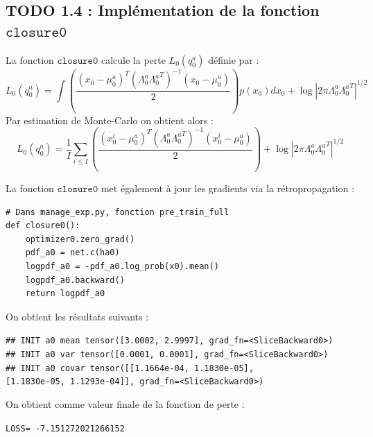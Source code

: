 \documentclass[12pt,a4paper]{article}
\begin{document}
\vspace{0.5cm}

\subsection*{TODO 1.4 : Implémentation de la fonction $\texttt{closure0}$}

La fonction $\texttt{closure0}$ calcule la perte $L_0(q_0^a)$ définie par :
\begin{equation}
    L_0(q_0^a) = \int \left( \frac{(x_0 - \mu^a_0)^T (\Lambda^a_0 {\Lambda^a_0}^T)^{-1} (x_0 - \mu^a_0)}{2} \right) p(x_0) dx_0 + \log |2 \pi \Lambda^a_0 {\Lambda^a_0}^T|^{1/2}
\end{equation}
Par estimation de Monte-Carlo on obtient alors :
\begin{equation}
    L_0(q_0^a) = \frac{1}{I} \sum_{i \leq I} \left( \frac{(x_0^i - \mu^a_0)^T (\Lambda^a_0 {\Lambda^a_0}^T)^{-1} (x_0^i - \mu^a_0)}{2} \right) + \log |2 \pi \Lambda^a_0 {\Lambda^a_0}^T|^{1/2}
\end{equation} 

La fonction $\texttt{closure0}$ met également à jour les gradients via la rétropropagation : \\

\begin{lstlisting}
# Dans manage_exp.py, fonction pre_train_full
def closure0():
    optimizer0.zero_grad()
    pdf_a0 = net.c(ha0)
    logpdf_a0 = -pdf_a0.log_prob(x0).mean()
    logpdf_a0.backward()
    return logpdf_a0
\end{lstlisting}

\vspace{0.5cm}

On obtient les résultats suivants :

\begin{tcolorbox}[colback=gray!10, colframe=gray!80, sharp corners, boxrule=0.5pt]
\small
\texttt{\#\# INIT a0 mean tensor([3.0002, 2.9997], grad\_fn=<SliceBackward0>)} \\
\texttt{\#\# INIT a0 var tensor([0.0001, 0.0001], grad\_fn=<SliceBackward0>)} \\
\texttt{\#\# INIT a0 covar tensor([[1.1664e-04, 1.1830e-05],} \\
\texttt{[1.1830e-05, 1.1293e-04]], grad\_fn=<SliceBackward0>)}
\end{tcolorbox}

On obtient comme valeur finale de la fonction de perte :
\begin{tcolorbox}[colback=gray!10, colframe=gray!80, sharp corners, boxrule=0.5pt]
\small
\texttt{LOSS= -7.151272021266152}
\end{tcolorbox}
\vspace{0.5cm}
\end{document}
